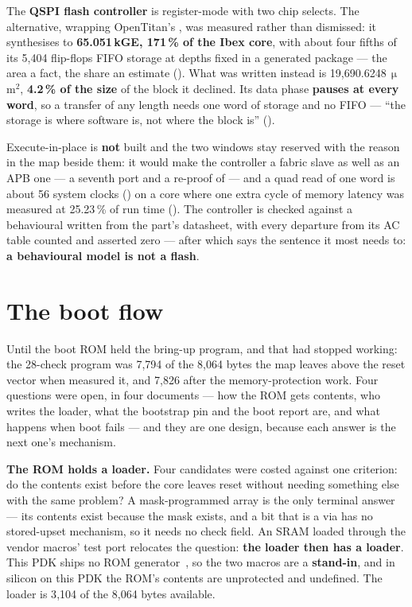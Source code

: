 The \textbf{QSPI flash controller} is register-mode with two chip
selects. The alternative, wrapping OpenTitan's , was measured
rather than dismissed: it synthesises to
\textbf{65.051\,kGE, 171\,\% of the Ibex core}, with about four fifths of
its 5{,}404 flip-flops FIFO storage at depths fixed in a generated
package --- the area a fact, the share an estimate
(). What was written instead is
19{,}690.6248\,$\upmu$m$^2$, \textbf{4.2\,\% of the size} of the block it
declined. Its data phase \textbf{pauses at every word}, so a transfer of any length
needs one word of storage and no FIFO --- ``the storage is where software
is, not where the block is'' ().

Execute-in-place is \textbf{not} built and the two windows stay reserved
with the reason in the map beside them: it would make the controller a
fabric slave as well as an APB one --- a seventh port and a re-proof of
 --- and a quad read of one word is about 56 system
clocks () on a core where one extra cycle of
memory latency was measured at 25.23\,\% of run time
(). The controller is checked against a behavioural  written
from the part's datasheet, with every departure from its AC table counted
and asserted zero --- after which  says the
sentence it most needs to: \textbf{a behavioural model is not a
flash}.

\section{The boot flow}

Until  the boot ROM held the bring-up program, and that had
stopped working: the 28-check program was 7{,}794 of the 8{,}064 bytes
the map leaves above the reset vector when  measured it, and
7{,}826 after the memory-protection work. Four questions were open, in
four documents --- how the ROM gets contents, who writes the loader, what
the bootstrap pin and the boot report are, and what happens when boot
fails --- and they are one
design, because each answer is the next one's mechanism.

\textbf{The ROM holds a loader.} Four candidates were costed against one
criterion: do the contents exist before the core leaves reset without
needing something else with the same problem? A mask-programmed array is
the only terminal answer --- its contents exist because the mask exists,
and a bit that is a via has no stored-upset mechanism, so it needs no
check field. An SRAM loaded through the vendor macros' test port
relocates the question: \textbf{the loader then has a loader}. This PDK
ships no ROM generator~\cite{ihppdk}, so the two  macros are a
\textbf{stand-in}, and in silicon on this PDK the ROM's contents are
unprotected and undefined. The loader is 3{,}104 of the 8{,}064 bytes
available.

